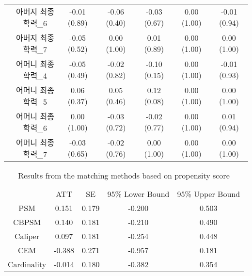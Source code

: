 \documentclass{article}
\begin{document}
\begin{table}[t]
{\begin{tabular}{cc|ccccc}
                                                                                               & 아버지 최종학력\_6  & -0.01 (0.89) & -0.06 (0.40) & -0.03 (0.67) & 0.00 (1.00)  & -0.01 (0.94)     \\
                                                                                               & 아버지 최종학력\_7  & -0.05 (0.52) & 0.00 (1.00) & 0.01 (0.89)  & 0.00 (1.00)  & 0.00 (1.00)     \\
                                                                                               & 어머니 최종학력\_4  & -0.05 (0.49) & -0.02 (0.82) & -0.10 (0.15) & 0.00 (1.00)  & -0.01 (0.93)     \\
                                                                                               & 어머니 최종학력\_5  & 0.06 (0.37)  & 0.05 (0.46)  & 0.12 (0.08)  & 0.00 (1.00)  & 0.00 (1.00)     \\
                                                                                               & 어머니 최종학력\_6  & 0.00 (1.00)  & -0.03 (0.72)  & -0.02 (0.77)   & 0.00 (1.00)  & 0.01 (0.94)     \\
                                                                                               & 어머니 최종학력\_7  & -0.03 (0.65) & -0.02 (0.76) & 0.00 (1.00)  & 0.00 (1.00)  & 0.00 (1.00)     \\ \hline
\end{tabular}}
\end{table}

\begin{table}[t]
\caption{Results from the matching methods based on propensity score} \label{tb7}
\footnotesize
   \centering
{\tabcolsep=20pt
\begin{tabular}{c||c|c|c|c}
\hline
            & ATT   & SE    & 95\% Lower Bound & 95\% Upper Bound \\ \hhline{=#=|=|=|=}
PSM          & 0.151 & 0.179 & -0.200      & 0.503       \\ \hline
CBPSM        & 0.140 & 0.181 & -0.210     & 0.490       \\ \hline
Caliper     & 0.097 & 0.181 & -0.254     & 0.448       \\ \hline
CEM         & -0.388    & 0.271    & -0.957         & 0.181          \\ \hline
Cardinality & -0.014 & 0.180 & -0.382    & 0.354       \\ \hline
\end{tabular}}
\end{table}
\end{document}

